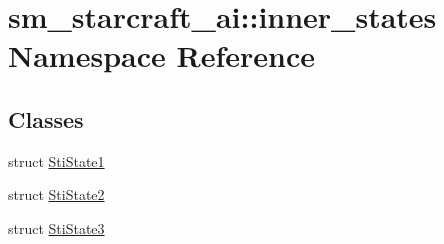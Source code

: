 \hypertarget{namespacesm__starcraft__ai_1_1inner__states}{}\section{sm\+\_\+starcraft\+\_\+ai\+:\+:inner\+\_\+states Namespace Reference}
\label{namespacesm__starcraft__ai_1_1inner__states}
\subsection*{Classes}
\begin{DoxyCompactItemize}
\item 
struct \hyperlink{structsm__starcraft__ai_1_1inner__states_1_1StiState1}{Sti\+State1}
\item 
struct \hyperlink{structsm__starcraft__ai_1_1inner__states_1_1StiState2}{Sti\+State2}
\item 
struct \hyperlink{structsm__starcraft__ai_1_1inner__states_1_1StiState3}{Sti\+State3}
\end{DoxyCompactItemize}
